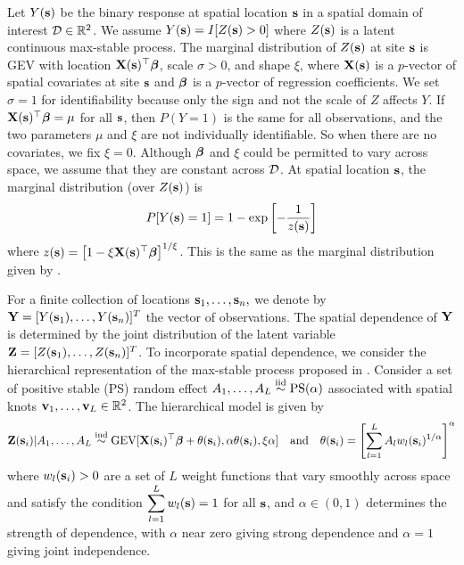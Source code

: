 \documentclass[12pt]{article}
\begin{document}
Let $Y(\mathbf{s})$ be the binary response at spatial location $\mathbf{s}$ in a spatial domain of interest ${\cal D} \in \mathbb{R}^2$.
We assume $Y(\mathbf{s}) = I[Z(\mathbf{s}) > 0]$ where $Z(\mathbf{s})$ is a latent continuous max-stable process.
The marginal distribution of $Z(\mathbf{s})$ at site $\mathbf{s}$ is GEV with location $\mathbf{X}(\mathbf{s})^\top \mbox{\boldmath $\beta$}$, scale $\sigma > 0$, and shape $\xi$, where $\mathbf{X}(\mathbf{s})$ is a $p$-vector of spatial covariates at site $\mathbf{s}$ and $\mbox{\boldmath $\beta$}$ is a $p$-vector of regression coefficients.
We set $\sigma = 1$ for identifiability because only the sign and not the scale of $Z$ affects $Y$.
If $\mathbf{X}(\mathbf{s})^\top \mbox{\boldmath $\beta$} = \mu$ for all $\mathbf{s}$, then $P(Y = 1)$ is the same for all observations, and the two parameters $\mu$ and $\xi$ are not individually identifiable.
So when there are no covariates, we fix $\xi = 0$.
Although $\mbox{\boldmath $\beta$}$ and $\xi$ could be permitted to vary across space, we assume that they are constant across ${\cal D}$.
At spatial location $\mathbf{s}$, the marginal distribution (over $Z(\mathbf{s})$) is 
\begin{align}
P[Y(\mathbf{s}) = 1] = 1 - \exp\left[ -\frac{ 1 }{ z(\mathbf{s}) } \right]
\end{align} 
where $z(\mathbf{s}) = \left[1 - \xi \mathbf{X}(\mathbf{s})^\top \mbox{\boldmath $\beta$}\right]^{1 / \xi}$.
This is the same as the marginal distribution given by \citet{Wang2010}.

For a finite collection of locations $\mathbf{s}_1, \ldots, \mathbf{s}_n,$ we denote by $\mathbf{Y} = [Y(\mathbf{s}_1), \ldots, Y(\mathbf{s}_n)]^T$ the vector of observations.
The spatial dependence of $\mathbf{Y}$ is determined by the joint distribution of the latent variable $\mathbf{Z} = [Z(\mathbf{s}_1),\ldots, Z(\mathbf{s}_n)]^T$.
To incorporate spatial dependence, we consider the hierarchical representation of the max-stable process proposed in \citet{Reich2012}.
Consider a set of positive stable (PS) random effect $A_1, \ldots, A_L \stackrel{\mathrm{iid}}{\sim} \text{PS}(\alpha)$ associated with spatial knots $\mathbf{v}_1, \ldots, \mathbf{v}_L \in \mathbb{R}^2$.
The hierarchical model is given by
\begin{align} \label{rbeq:hiermodel}
\mathbf{Z}(\mathbf{s}_i) | A_1, \ldots, A_L \stackrel{\mathrm{ind}}{\sim} \text{GEV}[\mathbf{X}(\mathbf{s}_i)^\top \mbox{\boldmath $\beta$} + \theta(\mathbf{s}_i), \alpha \theta(\mathbf{s}_i), \xi \alpha] \quad \text{and} \quad \theta(\mathbf{s}_i) = \left[\sum_{l = 1}^L A_l w_l (\mathbf{s}_i)^{1 / \alpha} \right]^\alpha
\end{align}
where $w_{l}(\mathbf{s}_i) > 0$ are a set of $L$ weight functions that vary smoothly across space and satisfy the condition \mbox{$\displaystyle \sum_{l = 1}^L w_l(\mathbf{s}) = 1$} for all $\mathbf{s}$, and $\alpha\in(0,1)$ determines the strength of dependence, with $\alpha$ near zero giving strong dependence and $\alpha=1$ giving joint independence.
\end{document}
